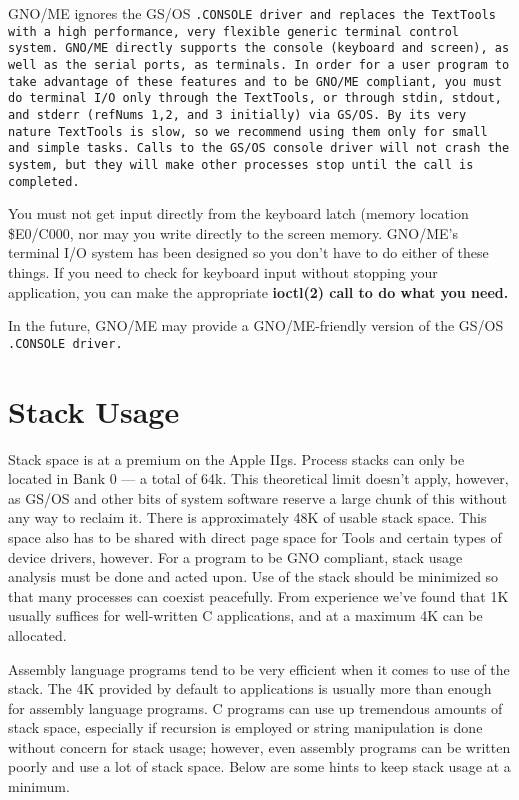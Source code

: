 \documentclass{report}
\begin{document}
GNO/ME ignores the GS/OS 
\tt .CONSOLE \rm driver and replaces
the TextTools with a high performance, very flexible
generic terminal control system.  GNO/ME directly supports the
console (keyboard and screen), as well as the serial ports, as
terminals. In order for a user program to take advantage of these
features and to be GNO/ME compliant, you must do terminal I/O
only through the TextTools, or through stdin, stdout, and stderr
(refNums 1,2, and 3 initially) via GS/OS. By its very nature
TextTools is slow, so we recommend using them only for small and
simple tasks. Calls to the GS/OS console driver will not crash
the system, but they will make other processes stop until the
call is completed.

You must not get input directly from the
keyboard latch (memory location \$E0/C000,
nor may you write directly to the screen memory.
GNO/ME's terminal I/O system has been designed so you don't have
to do either of these things. If you need to check for keyboard
input without stopping your application, you can make the
appropriate  \bf ioctl\rm(2) call to do what you need.

In the future, GNO/ME may provide a
GNO/ME-friendly version of the GS/OS 
\tt .CONSOLE \rm driver.

\section{Stack Usage}

Stack space is at a premium on the Apple IIgs.  Process
stacks can only be located in 
Bank 0 --- a total of 64k. This
theoretical limit doesn't apply, however, as GS/OS and other bits
of system software reserve a large chunk of this without any way
to reclaim it. There is approximately 48K of usable stack space.
This space also has to be shared with direct page space for Tools
and certain types of device drivers, however. For a program to be
GNO compliant, stack usage analysis must be done and acted upon.
Use of the stack should be minimized so that many processes can
coexist peacefully. From experience we've found that 1K usually
suffices for well-written C applications, and at a maximum 4K can
be allocated.

Assembly language programs tend to be very
efficient when it comes to use of the stack. The 4K provided by
default to applications is usually more than enough for assembly
language programs. C programs can use up tremendous amounts of
stack space, especially if recursion is employed or string
manipulation is done without concern for stack usage; however,
even assembly programs can be written poorly and use a lot of
stack space. Below are some hints to keep stack usage at a
minimum.
\end{document}
